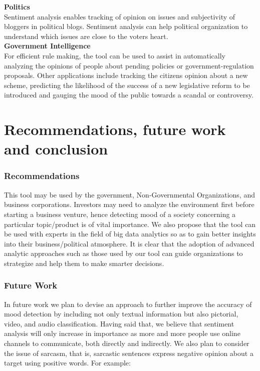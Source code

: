 \textbf{Politics}\\
Sentiment analysis enables tracking of opinion on issues and subjectivity of bloggers in
political blogs. Sentiment analysis can help political organization to understand which issues
are close to the voter\textquotesingle s heart.\\

\textbf{Government Intelligence}\\
For efficient rule making, the tool can be used to assist in automatically analyzing the opinions of
people about pending policies or government-regulation proposals. Other applications include
tracking the citizen\textquotesingle s opinion about a new scheme, predicting the likelihood of the success of a new legislative reform to be introduced and gauging the mood of the public towards a scandal
or controversy.



\chapter{Recommendations, future work and conclusion}
\subsection{Recommendations}
This tool may be used by the government, Non-Governmental Organizations, and business
corporations. Investors may need to analyze the environment first before starting a business
venture, hence detecting mood of a society concerning a particular topic/product is of vital importance.
We also propose that the tool can be used with experts in the field of big data analytics so as to gain
better insights into their business/political atmosphere. It is clear that the adoption of advanced analytic approaches such as those used by our tool can guide organizations to  strategize and help them to make smarter decisions.\\

\subsection{Future Work}
In future work we plan to devise an approach to further improve the accuracy of mood detection by including not only textual information but also pictorial, video, and audio classification.
Having said that, we believe that sentiment analysis will only increase in importance as more and
more people use online channels to communicate, both directly and indirectly.
We also plan to consider the issue of sarcasm, that is, sarcastic sentences express negative opinion
about a target using positive words. For example:\\


